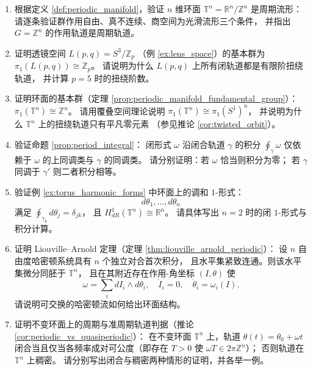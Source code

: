 \begin{enumerate}[leftmargin=3em, label=\textbf{题 \arabic*}]
    \item 根据定义 \ref{def:periodic_manifold}，验证 $n$ 维环面
    $\mathbb{T}^n=\mathbb{R}^n/\mathbb{Z}^n$ 是周期流形：
    请逐条验证群作用自由、真不连续、商空间为光滑流形三个条件，
    并指出 $G=\mathbb{Z}^n$ 的作用轨道是周期轨道。

    \item 证明透镜空间 $L(p,q)=S^3/\mathbb{Z}_p$
    （例 \ref{ex:lens_space}）的基本群为 $\pi_1(L(p,q))\cong\mathbb{Z}_p$。
    请说明为什么 $L(p,q)$ 上所有闭轨道都是有限阶扭绕轨道，
    并计算 $p=5$ 时的扭绕阶数。

    \item 证明环面的基本群（定理 \ref{prop:periodic_manifold_fundamental_group}）：
    $\pi_1(\mathbb{T}^n)\cong\mathbb{Z}^n$。
    请用覆叠空间理论说明 $\pi_1(\mathbb{T}^n)\cong\pi_1(S^1)^n$，
    并说明为什么 $\mathbb{T}^n$ 上的扭绕轨道只有平凡零元素
    （参见推论 \ref{cor:twisted_orbit}）。

    \item 验证命题 \ref{prop:period_integral}：
    闭形式 $\omega$ 沿闭合轨道 $\gamma$ 的积分 $\oint_\gamma\omega$
    仅依赖于 $\omega$ 的上同调类与 $\gamma$ 的同调类。
    请分别证明：若 $\omega$ 恰当则积分为零；
    若 $\gamma$ 同调于 $\gamma'$ 则二者积分相等。

    \item 验证例 \ref{ex:torus_harmonic_forms} 中环面上的调和 $1$-形式：
    \[
    d\theta_1,\dots,d\theta_n
    \]
    满足 $\oint_{\gamma_k}d\theta_j=\delta_{jk}$，
    且 $H^1_{dR}(\mathbb{T}^n)\cong\mathbb{R}^n$。
    请具体写出 $n=2$ 时的闭 $1$-形式与积分计算。

    \item 证明 Liouville--Arnold 定理（定理 \ref{thm:liouville_arnold_periodic}）：
    设 $n$ 自由度哈密顿系统具有 $n$ 个独立对合首次积分，
    且水平集紧致连通。则该水平集微分同胚于 $\mathbb{T}^n$，
    且在其附近存在作用-角坐标 $(I,\theta)$ 使
    \[
    \omega=\sum_i dI_i\wedge d\theta_i,\quad
    \dot{I}_i=0,\quad \dot{\theta}_i=\omega_i(I).
    \]
    请说明可交换的哈密顿流如何给出环面结构。

    \item 证明不变环面上的周期与准周期轨道判据（推论 \ref{cor:periodic_vs_quasiperiodic}）：
    在不变环面 $\mathbb{T}^n$ 上，轨道 $\theta(t)=\theta_0+\omega t$
    闭合当且仅当各频率成对可公度（即存在 $T>0$ 使 $\omega T\in2\pi\mathbb{Z}^n$）；
    否则轨道在 $\mathbb{T}^n$ 上稠密。
    请分别写出闭合与稠密两种情形的证明，并各举一例。


\end{enumerate}
